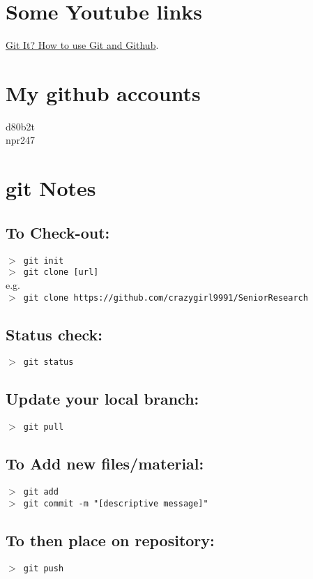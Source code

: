 \documentclass[11pt,a4paper]{article}
\begin{document}
\newpage
\section{Some Youtube links}
 \href{https://www.youtube.com/watch?v=HkdAHXoRtos}{Git It? How to use Git and Github}.





 

\section{My github accounts}
d80b2t\\
npr247\\




\section{git Notes}

    \subsection{To Check-out:}
   {\tt  $>$ git init\\
    $>$ git clone [url]} \\
     e.g.\\ 
    {\tt $>$ git clone https://github.com/crazygirl9991/SeniorResearch\\
   }

    \subsection{Status check:}
   {\tt $>$ git status}\\

 
    \subsection{Update your local branch:}
    {\tt $>$ git pull}\\


    \subsection{To Add new files/material:}
    {\tt $>$ git add\\
     $>$ git commit -m "[descriptive message]" } \\

   \subsection{To then place on repository:}
   {\tt $>$ git push }\\
\end{document}
